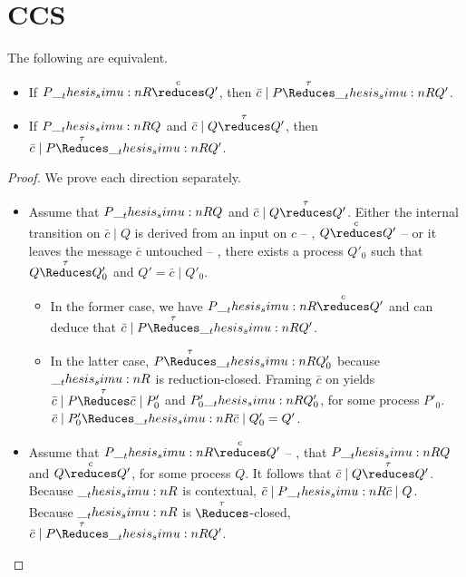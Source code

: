 \chapter{\acs*{CCS}}

\begin{theorem}
  The following are equivalent.
  \begin{itemize}
  \item If $P \simu{R}\overset{c}{\reduces} Q'$, then $\bar{c} \mid P \overset{\tau}{\Reduces}\simu{R} Q'$.
  \item If $P \__thesis_simu:n {R} Q$ and $\bar{c} \mid Q \overset{\tau}{\reduces} Q'$, then $\bar{c} \mid P \overset{\tau}{\Reduces}\simu{R} Q'$.
  \end{itemize}
\end{theorem}
\begin{proof}
  We prove each direction separately.
  \begin{itemize}
  \item 
  Assume that $P \__thesis_simu:n {R} Q$ and $\bar{c} \mid Q \overset{\tau}{\reduces} Q'$.
  Either the internal transition on $\bar{c} \mid Q$ is derived from an input on $c$ -- \ie, $Q \overset{c}{\reduces} Q'$ -- or it leaves the message $\bar{c}$ untouched -- \ie, there exists a process $Q'_0$ such that $Q \overset{\tau}{\Reduces} Q'_0$ and $Q' = \bar{c} \mid Q'_0$.
  \begin{itemize}
  \item
    In the former case, we have $P \simu{R}\overset{c}{\reduces} Q'$ and can deduce that $\bar{c} \mid P \overset{\tau}{\Reduces}\simu{R} Q'$.
  \item 
    In the latter case, $P \overset{\tau}{\Reduces}\simu{R} Q'_0$ because $\__thesis_simu:n {R}$ is reduction-closed.
    Framing $\bar{c}$ on yields $\bar{c} \mid P \overset{\tau}{\Reduces} \bar{c} \mid P'_0$ and $P'_0 \__thesis_simu:n {R} Q'_0$, for some process $P'_0$.
    $\bar{c} \mid P'_0 \Reduces\simu{R} \bar{c} \mid Q'_0 = Q'$.
  \end{itemize}

  \item 
  Assume that $P \simu{R}\overset{c}{\reduces} Q'$ -- \ie, that $P \__thesis_simu:n {R} Q$ and $Q \overset{c}{\reduces} Q'$, for some process $Q$.
  It follows that $\bar{c} \mid Q \overset{\tau}{\reduces} Q'$.
  Because $\__thesis_simu:n {R}$ is contextual, $\bar{c} \mid P \__thesis_simu:n {R} \bar{c} \mid Q$.
  Because $\__thesis_simu:n {R}$ is $\overset{\tau}{\Reduces}$-closed, $\bar{c} \mid P \overset{\tau}{\Reduces}\simu{R} Q'$.
  \qedhere
\end{itemize}
\end{proof}

